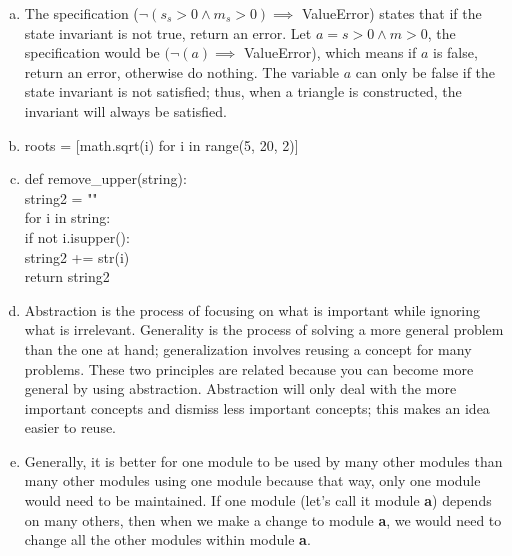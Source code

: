 \documentclass[12pt]{article}
\begin{document}
\begin{enumerate}[a)]
\item
	The specification ($\neg(s_s > 0 \wedge m_s > 0) \implies$ ValueError) states that if the state invariant is not true, return an error. Let $a = s > 0 \wedge m > 0$, the specification would be $(\neg(a) \implies$ ValueError), which means if $a$ is false, return an error, otherwise do nothing. The variable $a$ can only be false if the state invariant is not satisfied; thus, when a triangle is constructed, the invariant will always be satisfied.
\item	
	roots = [math.sqrt(i) for i in range(5, 20, 2)]

\item
	def remove\_upper(string): \\
	\hspace*{0.5cm} string2 = "" \\
	\hspace*{0.5cm} for i in string: \\
	\hspace*{1cm} if not i.isupper(): \\
	\hspace*{1.5cm} string2 += str(i) \\
	\hspace*{0.5cm} return string2 

\item
	Abstraction is the process of focusing on what is important while ignoring what is irrelevant. Generality is the process of solving a more general problem than the one at hand; generalization involves reusing a concept for many problems. These two principles are related because you can become more general by using abstraction. Abstraction will only deal with the more important concepts and dismiss less important concepts; this makes an idea easier to reuse. 

\item
	Generally, it is better for one module to be used by many other modules than many other modules using one module because that way, only one module would need to be maintained. If one module (let’s call it module \textbf{a}) depends on many others, then when we make a change to module \textbf{a}, we would need to change all the other modules within module \textbf{a}.

\end{enumerate}

\newpage

\lstset{language=Python, basicstyle=\tiny, breaklines=true, showspaces=false,
  showstringspaces=false, breakatwhitespace=true}
\end{document}
